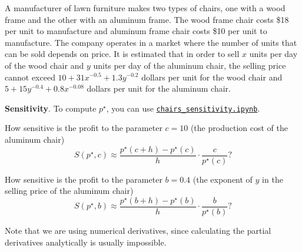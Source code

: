 \begin{slide}

\question

\begin{problem}%
	A manufacturer of lawn furniture makes two types of chairs, one with a wood frame and the other with an aluminum frame. The wood frame chair costs \$18 per unit to manufacture and aluminum frame chair costs \$10 per unit to manufacture. The company operates in a market where the number of units that can be sold depends on price. It is estimated that in order to sell $x$ units per day of the wood chair and $y$ units per day of the aluminum chair, the selling price cannot exceed $10 + 31x^{-0.5} + 1.3y^{-0.2}$ dollars per unit for the wood chair and $5 + 15y^{-0.4} + 0.8x^{-0.08}$ dollars per unit for the aluminum chair.
\end{problem}


\textbf{Sensitivity}. To compute $p^\star$, you can use \href{https://utoronto.syzygy.ca/jupyter/user-redirect/git-pull?repo=https://github.com/bigfatbernie/IBLMathModeling&subPath=book/python/chairs_sensitivity.ipynb}{\tt chairs_sensitivity.ipynb}.

\begin{parts}
	\item How sensitive is the profit to the parameter $c = 10$ (the production cost of the aluminum chair)
		\[ S(p^\star, c) %
			\approx \frac{p^\star(c+h) - p^\star(c)}{h} \cdot \frac{c}{p^\star(c)}?
		\]

	\item How sensitive is the profit to the parameter $b = 0.4$ (the exponent of $y$ in the selling price of the aluminum chair)
		\[ S(p^\star, b) \approx \frac{p^\star(b+h) - p^\star(b)}{h} \cdot \frac{b}{p^\star(b)}?
		\]
\end{parts}


\begin{solution}
\hspace{-3em}Note that we are using numerical derivatives, since calculating the partial derivatives analytically is usually impossible.	
\end{solution}



\end{slide}






